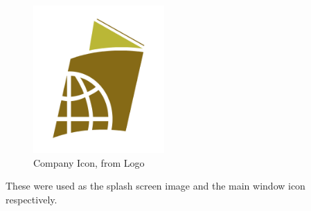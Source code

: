 \begin{figure}[H]
    \includegraphics[width=5cm]{./Implementation/Database/PPIcon.png}
    \caption{Company Icon, from Logo}
\end{figure}

These were used as the splash screen image and the main window icon respectively.

